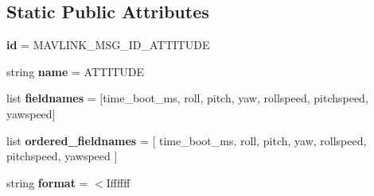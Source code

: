 \subsection*{Static Public Attributes}
\begin{DoxyCompactItemize}
\item 
\mbox{\label{classpymavlink_1_1dialects_1_1v10_1_1MAVLink__attitude__message_a768446716b0cb887a166225f7640b724}} 
{\bfseries id} = M\+A\+V\+L\+I\+N\+K\+\_\+\+M\+S\+G\+\_\+\+I\+D\+\_\+\+A\+T\+T\+I\+T\+U\+DE
\item 
\mbox{\label{classpymavlink_1_1dialects_1_1v10_1_1MAVLink__attitude__message_af684737f9b68ae0f68b70b48a37e9e3a}} 
string {\bfseries name} = \textquotesingle{}A\+T\+T\+I\+T\+U\+DE\textquotesingle{}
\item 
\mbox{\label{classpymavlink_1_1dialects_1_1v10_1_1MAVLink__attitude__message_a34fa13b33d16d66d808e0ecf3ee33b11}} 
list {\bfseries fieldnames} = \mbox{[}\textquotesingle{}time\+\_\+boot\+\_\+ms\textquotesingle{}, \textquotesingle{}roll\textquotesingle{}, \textquotesingle{}pitch\textquotesingle{}, \textquotesingle{}yaw\textquotesingle{}, \textquotesingle{}rollspeed\textquotesingle{}, \textquotesingle{}pitchspeed\textquotesingle{}, \textquotesingle{}yawspeed\textquotesingle{}\mbox{]}
\item 
\mbox{\label{classpymavlink_1_1dialects_1_1v10_1_1MAVLink__attitude__message_a85e58c5e17e0cc5ab8fb1daa4c115e77}} 
list {\bfseries ordered\+\_\+fieldnames} = \mbox{[} \textquotesingle{}time\+\_\+boot\+\_\+ms\textquotesingle{}, \textquotesingle{}roll\textquotesingle{}, \textquotesingle{}pitch\textquotesingle{}, \textquotesingle{}yaw\textquotesingle{}, \textquotesingle{}rollspeed\textquotesingle{}, \textquotesingle{}pitchspeed\textquotesingle{}, \textquotesingle{}yawspeed\textquotesingle{} \mbox{]}
\item 
\mbox{\label{classpymavlink_1_1dialects_1_1v10_1_1MAVLink__attitude__message_a0dc13305fdfb29ac081d86418adbe632}} 
string {\bfseries format} = \textquotesingle{}$<$Iffffff\textquotesingle{}

\end{DoxyCompactItemize}
